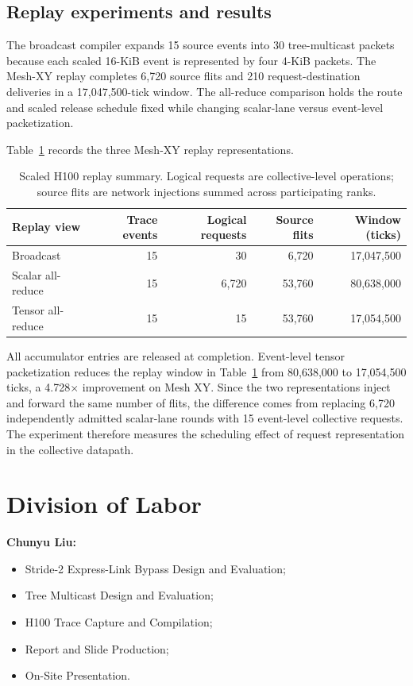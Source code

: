 \documentclass[10pt]{article}
\newcommand{\FloatBarrier}{\par}
\begin{document}
\subsection{Replay experiments and results}

The broadcast compiler expands 15 source events into 30 tree-multicast packets
because each scaled 16-KiB event is represented by four 4-KiB packets.  The
Mesh-XY replay completes 6,720 source flits and 210 request-destination
deliveries in a 17,047,500-tick window.  The all-reduce comparison holds the
route and scaled release schedule fixed while changing scalar-lane versus
event-level packetization.

Table~\ref{tab:h100-replay} records the three Mesh-XY replay representations.

\begin{table}[ht]
\centering
\caption{Scaled H100 replay summary.  Logical requests are collective-level
operations; source flits are network injections summed across participating
ranks.}
\label{tab:h100-replay}
\begin{tabular}{@{}lrrrr@{}}
\toprule
Replay view & Trace events & Logical requests & Source flits & Window (ticks) \\
\midrule
Broadcast & 15 & 30 & 6,720 & 17,047,500 \\
Scalar all-reduce & 15 & 6,720 & 53,760 & 80,638,000 \\
Tensor all-reduce & 15 & 15 & 53,760 & 17,054,500 \\
\bottomrule
\end{tabular}
\end{table}

All accumulator entries are released at completion.  Event-level tensor
packetization reduces the replay window in Table~\ref{tab:h100-replay} from 80,638,000 to
17,054,500 ticks, a 4.728$\times$ improvement on Mesh XY.  Since the
two representations inject and forward the same number of flits, the
difference comes from replacing 6,720 independently admitted scalar-lane rounds
with 15 event-level collective requests.  The experiment therefore measures
the scheduling effect of request representation in the collective datapath.

\FloatBarrier

\section{Division of Labor}

\noindent\textbf{Chunyu Liu:}
\begin{itemize}
  \item Stride-2 Express-Link Bypass Design and Evaluation;
  \item Tree Multicast Design and Evaluation;
  \item H100 Trace Capture and Compilation;
  \item Report and Slide Production;
  \item On-Site Presentation.
\end{itemize}
\end{document}
